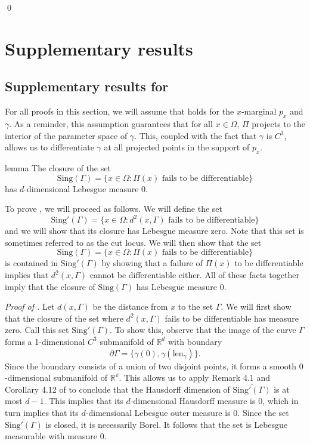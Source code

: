 \documentclass[11pt]{article}
\begin{document}
\qed{}

\section{Supplementary results}


\subsection{Supplementary results for }

For all proofs in this section, we will assume that  holds for the $x$-marginal $p_x$ and $\gamma$. As a reminder, this assumption guarantees that for all $x \in \Omega$,  $\Pi$ projects to the interior of the parameter space of $\gamma$. This, coupled with the fact that $\gamma$ is $C^3$, allows us to differentiate $\gamma$ at all projected points in the support of $p_x$.  

\begin{restatable}{lemma}{} \label{lemma: singular set measure}
    The closure of the set 
    \begin{equation}\text{Sing}(\Gamma) = \{x \in \Omega: \Pi(x) \text{ fails to be differentiable}\} \label{eq: singular set}
    \end{equation}
    has $d$-dimensional Lebesgue measure $0$. 
\end{restatable}
\noindent To prove , we will proceed as follows.  We will define the set 
\[\text{Sing}'(\Gamma) = \{x \in \Omega :  d^2(x, \Gamma) \text{ fails to be differentiable}\}\]
and we will show that its closure has Lebesgue measure zero. Note that this set is sometimes referred to as the cut locus. We will then show that the set 
\[\text{Sing}(\Gamma) = \{x \in \Omega :  \Pi(x) \text{ fails to be differentiable}\}\]
is contained in $\text{Sing}'(\Gamma)$ by showing that a failure of $\Pi(x)$ to be differentiable implies that $d^2(x, \Gamma)$ cannot be differentiable either. All of these facts together imply that the closure of $\text{Sing}(\Gamma)$ has Lebesgue measure $0$.

\textit{Proof of .} Let $d(x, \Gamma)$ be the distance from $x$ to the set $\Gamma$. We will first show that the closure of the set where $d^2(x,\Gamma)$ fails to be differentiable has measure zero. Call this set $\text{Sing}'(\Gamma)$. To show this, observe that the image of the curve $\Gamma$ forms a 1-dimensional $C^3$ submanifold of $\mathbb{R}^d$ with boundary
\[\partial\Gamma = \{\gamma(0), \gamma(\text{len}_{\gamma})\}.\]
Since the boundary consists of a union of two disjoint points, it forms a smooth $0$-dimensional submanifold of $\mathbb{R^d}$. This allows us to apply Remark 4.1 and Corollary 4.12 of \citet{mantegazza2002hamilton} to conclude that the Hausdorff dimension of $\overline{\text{Sing}'(\Gamma)}$ is at most $d-1$. This implies that its $d$-dimensional Hausdorff measure is $0$, which in turn implies that its $d$-dimensional Lebesgue outer measure is $0$. Since the set $\overline{\text{Sing}'(\Gamma)}$ is closed, it is necessarily Borel. It follows that the set is Lebesgue measurable with measure $0$. 
\end{document}

